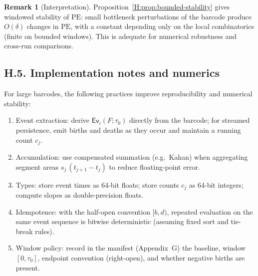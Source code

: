 \documentclass[11pt]{article}
\numberwithin{equation}{section}
\theoremstyle{plain}
\theoremstyle{definition}
\theoremstyle{remark}
\theoremstyle{plain}
\theoremstyle{definition}
\numberwithin{equation}{section}
\theoremstyle{definition}
\newtheorem{remark}[theorem]{Remark}
\numberwithin{equation}{section}
\theoremstyle{plain}
\theoremstyle{definition}
\theoremstyle{remark}
\begin{document}
\begin{remark}[Interpretation]
Proposition~\ref{H:prop:bounded-stability} gives windowed stability of $\mathrm{PE}$: small bottleneck perturbations of the barcode produce $O(\delta)$ changes in $\mathrm{PE}$, with a constant depending only on the local combinatorics (finite on bounded windows). This is adequate for numerical robustness and cross-run comparisons.
\end{remark}

\subsection*{H.5. Implementation notes and numerics}
For large barcodes, the following practices improve reproducibility and numerical stability:
\begin{enumerate}
  \item Event extraction: derive $\mathsf{Ev}_i(F;\tau_0)$ directly from the barcode; for streamed persistence, emit births and deaths as they occur and maintain a running count $c_j$.
  \item Accumulation: use compensated summation (e.g.\ Kahan) when aggregating segment areas $s_j\,(t_{j+1}-t_j)$ to reduce floating-point error.
  \item Types: store event times as 64-bit floats; store counts $c_j$ as 64-bit integers; compute slopes as double-precision floats.
  \item Idempotence: with the half-open convention $[b,d)$, repeated evaluation on the same event sequence is bitwise deterministic (assuming fixed sort and tie-break rules).
  \item Window policy: record in the manifest (Appendix~G) the baseline, window $[0,\tau_0]$, endpoint convention (right-open), and whether negative births are present.
\end{enumerate}
\end{document}
